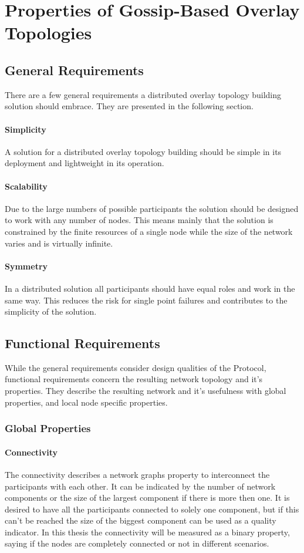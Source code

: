 \chapter{Properties of Gossip-Based Overlay Topologies} 
\label{chap:propertiess}

\section{General Requirements}
There are a few general requirements a distributed overlay topology building
solution should embrace. They are presented in the following section.
\subsubsection{Simplicity}
A solution for a distributed overlay topology building should be simple in its
deployment and lightweight in its operation. 
\subsubsection{Scalability}
Due to the large numbers of possible participants the solution should be
designed to work with any number of nodes. This means mainly that the solution
is constrained by the finite resources of a single node while the size of the
network varies and is virtually infinite.

\subsubsection{Symmetry}
In a distributed solution all participants should have equal roles and work in
the same way. This reduces the risk for single point failures and contributes to
the simplicity of the solution.

\section{Functional Requirements}
While the general requirements consider design qualities of the Protocol,
functional requirements concern the resulting network topology and it's
properties. They describe the resulting network and it’s usefulness with global
properties, and local node specific properties.

\subsection{Global Properties}

\subsubsection{Connectivity}
The connectivity describes a network graphs property to interconnect the
participants with each other. It can be indicated by the number of network
components or the size of the largest component if there is more then one. It is
desired to have all the participants connected to solely one component, but if
this can't be reached the size of the biggest component can be used as a quality
indicator. In this thesis the connectivity will be measured as a binary
property, saying if the nodes are completely connected or not in different
scenarios.
